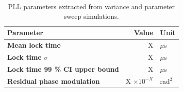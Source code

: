 		\begin{table}[h!]
			\centering
			\def\arraystretch{1.5}		
			\setlength\arrayrulewidth{0.75pt}
			\setlength{\tabcolsep}{1em} %
			\begin{tabular}{|l|r|l|}
				\hline 
				\rule[-1ex]{0pt}{2.5ex} \cellcolor{gray!40}\textbf{Parameter} & \cellcolor{gray!40}\textbf{Value} & \cellcolor{gray!40}\textbf{Unit }\\ 
				\hline 
				\rule[-1ex]{0pt}{2.5ex} \textbf{Mean lock time}  & X& $\mu$s \\
				\hline 
				\rule[-1ex]{0pt}{2.5ex} \textbf{Lock time $\sigma$} &X & $\mu$s\\ 
				\hline 
				\rule[-1ex]{0pt}{2.5ex} \textbf{Lock time 99 \% CI upper bound} & X & $\mu$s\\
				\hline 
				\rule[-1ex]{0pt}{2.5ex} \textbf{Residual phase modulation} & X $\times10^{-X}$ & rad$^2$\\ 
				\hline 
			\end{tabular} 

			\caption{PLL parameters extracted from variance and parameter sweep simulations.}
			\label{simulation_params_fast}
		\end{table}




